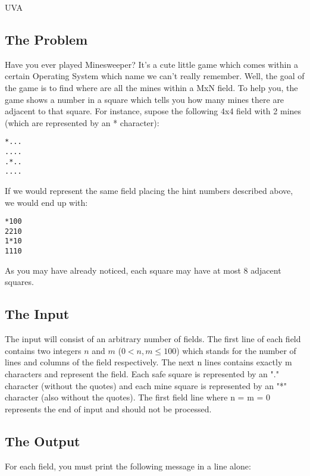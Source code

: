  

\noindent
UVA \bigskip

\subsection*{The Problem}

Have you ever played Minesweeper? It's a cute little game which comes within a certain 
Operating System which name we can't really remember. Well, the goal of the game is to
find where are all the mines within a MxN field. To help you, the game shows a number
in a square which tells you how many mines there are adjacent to that square. For instance,
supose the following 4x4 field with 2 mines (which are represented by an * character):

\begin{verbatim}
*...
....
.*..
....
\end{verbatim}

If we would represent the same field placing the hint numbers described above, we would end up with:

\begin{verbatim}
*100
2210
1*10
1110
\end{verbatim}

As you may have already noticed, each square may have at most 8 adjacent squares.

\subsection*{The Input}

The input will consist of an arbitrary number of fields. The first line of each field contains
two integers $n$ and $m$ ($0 < n,m \leqslant 100$) which stands for the number of lines and columns of the field
respectively. The next n lines contains exactly m characters and represent the field. Each safe
square is represented by an "." character (without the quotes) and each mine square is represented
by an "*" character (also without the quotes). The first field line where n = m = 0 represents the end 
of input and should not be processed.

\subsection*{The Output}

For each field, you must print the following message in a line alone:

